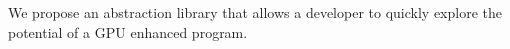 We propose an abstraction library that allows a developer to quickly explore the potential of a GPU enhanced program.